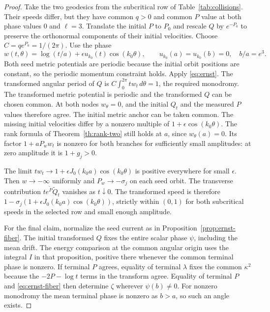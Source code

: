 \begin{proof}
Take the two geodesics from the subcritical row
of Table~\ref{tab:collisions}. Their speeds differ,
but they have common $q>0$ and common $P$ value
at both phase values $0$ and $\ell=3$.
Translate the initial $P$ to $P_0$ and rescale $Q$
by $e^{-P_0}$ to preserve the orthonormal components
of their initial velocities. Choose
$C=q e^{P_0}=1/(2\pi)$.
Use the phase
\[
 w(t,\theta)=\log(t/a)+\epsilon u_{k_0}(t)\cos(k_0\theta),
 \qquad u_{k_0}(a)=u_{k_0}(b)=0,\quad b/a=e^3 .
\]
Both seed metric potentials are periodic because
the initial orbit positions are constant, so the
periodic momentum constraint holds.
Apply \eqref{eq:ernst}. The transformed angular
period of $Q$ is
$C\int_0^{2\pi}t w_t\,d\theta=1$,
the required monodromy. The transformed metric potential
is periodic and the transformed $Q$ can be chosen common.
At both nodes $w_\theta=0$, and the initial
$Q_t$ and the measured $P$ values therefore agree.
The initial metric anchor can be taken common.
The missing initial velocities differ by a nonzero
multiple of $1+\epsilon\cos(k_0\theta)$.
The rank formula of Theorem~\ref{th:rank-two} still
holds at $a$, since $w_\theta(a)=0$.
Its factor $1+aP_w w_t$ is nonzero for both branches
for sufficiently small amplitudes: at zero amplitude
it is $1+g_j>0$.

The limit $t w_t\to1+\epsilon J_0(k_0a)\cos(k_0\theta)$
is positive everywhere for small $\epsilon$.
Then $w\to-\infty$ uniformly and $P_w\to-\sigma_j$
on each seed orbit. The transverse contribution
$t e^{\widetilde P}\widetilde Q_t$
vanishes as $t\downarrow0$.
The transformed speed is therefore
$1-\sigma_j(1+\epsilon J_0(k_0a)\cos(k_0\theta))$,
strictly within $(0,1)$ for both subcritical speeds
in the selected row and small enough amplitude.

For the final claim, normalize the seed current as
in Proposition~\ref{prop:ernst-fiber}.
The initial transformed $Q$ fixes the entire scalar
phase $\psi$, including the mean drift.
The energy comparison at the common angular origin
uses the integral $I$ in that proposition, positive
there whenever the common terminal phase is
nonzero. If terminal $P$ agrees, equality of terminal
$\lambda$ fixes the common $\kappa^2$ because the
$-2P-\log t$ terms in the transform agree.
Equality of terminal $P$ and \eqref{eq:ernst-fiber}
then determine $\zeta$ wherever $\psi(b)\ne0$.
For nonzero monodromy the mean terminal phase is
nonzero as $b>a$, so such an angle exists.
\end{proof}
